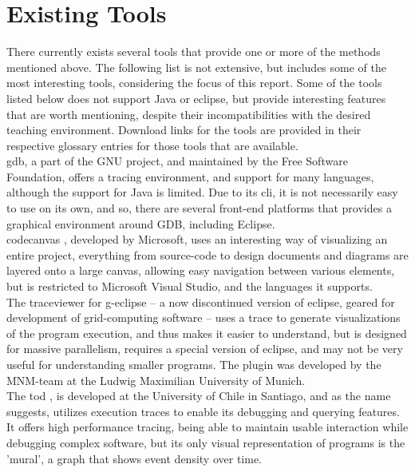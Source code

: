 \section{Existing Tools}\label{PreTools}%
There currently exists several tools that provide one or more of the methods mentioned above.
The following list is not extensive, but includes some of the most interesting tools, considering the focus of this report.
Some of the tools listed below does not support Java or eclipse, but provide interesting features that are worth mentioning, despite their incompatibilities with the desired teaching environment.
Download links for the tools are provided in their respective glossary entries for those tools that are available.
~\\

\gls{gdb}, a part of the GNU project, and maintained by the Free Software Foundation, offers a tracing environment, and support for many languages, although the support for Java is limited.
Due to its \gls{cli}, it is not necessarily easy to use on its own, and so, there are several front-end platforms that provides a graphical environment around GDB, including Eclipse.
~\\

\Gls{codecanvas} \cite{Deline2010}, developed by Microsoft, uses an interesting way of visualizing an entire project, everything from source-code to design documents and diagrams are layered onto a large canvas, allowing easy navigation between various elements, but is restricted to Microsoft Visual Studio, and the languages it supports.
~\\

The \gls{traceviewer} \cite{Thomas2010} for g-eclipse -- a now discontinued version of eclipse, geared for development of grid-computing software -- uses a trace to generate visualizations of the program execution, and thus makes it easier to understand, but is designed for massive parallelism, requires a special version of eclipse, and may not be very useful for understanding smaller programs.
The plugin was developed by the MNM-team at the Ludwig Maximilian University of Munich.
~\\

The \gls{tod} \cite{Pothier2007}, is developed at the University of Chile in Santiago, and as the name suggests, utilizes execution traces to enable its debugging and querying features.
It offers high performance tracing, being able to maintain usable interaction while debugging complex software, but its only visual representation of programs is the 'mural', a graph that shows event density over time.
~\\

